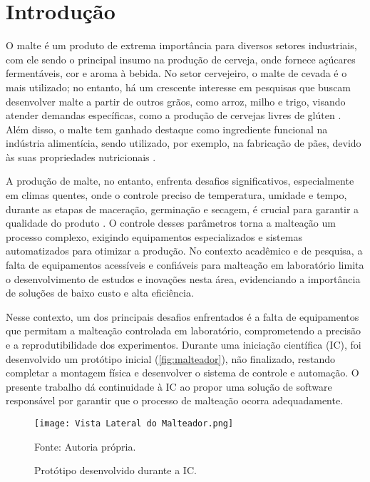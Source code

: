 \chapter[Introdução]{Introdução}

O malte é um produto de extrema importância para diversos setores industriais, com ele sendo o principal insumo na produção de cerveja, onde fornece açúcares fermentáveis, cor e aroma à bebida. No setor cervejeiro, o malte de cevada é o mais utilizado; no entanto, há um crescente interesse em pesquisas que buscam desenvolver malte a partir de outros grãos, como arroz, milho e trigo, visando atender demandas específicas, como a produção de cervejas livres de glúten \cite{CECCARONI2019}. Além disso, o malte tem ganhado destaque como ingrediente funcional na indústria alimentícia, sendo utilizado, por exemplo, na fabricação de pães, devido às suas propriedades nutricionais \cite{KOISTINEN2020}.

A produção de malte, no entanto, enfrenta desafios significativos, especialmente em climas quentes, onde o controle preciso de temperatura, umidade e tempo, durante as etapas de maceração, germinação e secagem, é crucial para garantir a qualidade do produto \cite{KOVALOVA2024}. O controle desses parâmetros torna a malteação um processo complexo, exigindo equipamentos especializados e sistemas automatizados para otimizar a produção. No contexto acadêmico e de pesquisa, a falta de equipamentos acessíveis e confiáveis para malteação em laboratório limita o desenvolvimento de estudos e inovações nesta área, evidenciando a importância de soluções de baixo custo e alta eficiência.

Nesse contexto, um dos principais desafios enfrentados é a falta de equipamentos que permitam a malteação controlada em laboratório, comprometendo a precisão e a reprodutibilidade dos experimentos. Durante uma iniciação científica (IC), foi desenvolvido um protótipo inicial (\autoref{fig:malteador}), não finalizado, restando completar a montagem física e desenvolver o sistema de controle e automação. O presente trabalho dá continuidade à IC ao propor uma solução de software responsável por garantir que o processo de malteação ocorra adequadamente.

\begin{figure}[ht]
    \centering
    \caption{Protótipo desenvolvido durante a IC.}
    \label{fig:malteador}
    \texttt{[image: Vista Lateral do Malteador.png]}

    {\centering\footnotesize Fonte: Autoria própria.\par}
\end{figure}

